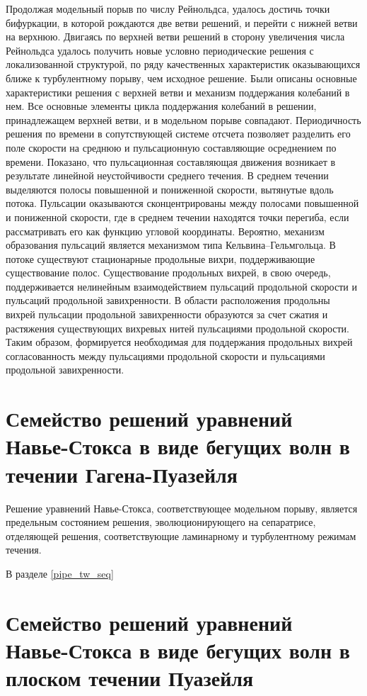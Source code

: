 Продолжая модельный порыв по числу Рейнольдса, удалось достичь точки бифуркации, в которой рождаются две ветви решений, и перейти с нижней ветви на верхнюю. Двигаясь по верхней ветви решений в сторону увеличения числа Рейнольдса удалось получить новые условно периодические решения с локализованной структурой, по ряду качественных характеристик оказывающихся ближе к турбулентному порыву, чем исходное решение. Были описаны основные характеристики решения с верхней ветви и механизм поддержания колебаний в нем. Все основные элементы цикла поддержания колебаний в решении, принадлежащем верхней ветви, и в модельном порыве совпадают. Периодичность решения по времени в сопутствующей системе отсчета позволяет разделить его поле скорости на среднюю и пульсационную составляющие осреднением по времени. Показано, что пульсационная составляющая движения возникает в результате линейной неустойчивости среднего течения. В среднем течении выделяются полосы повышенной и пониженной скорости, вытянутые вдоль потока. Пульсации оказываются сконцентрированы между полосами повышенной и пониженной скорости, где в среднем течении находятся точки перегиба, если рассматривать его как функцию угловой координаты. Вероятно, механизм образования пульсаций является механизмом типа Кельвина--Гельмгольца. В потоке существуют стационарные продольные вихри, поддерживающие существование полос. Существование продольных вихрей, в свою очередь, поддерживается нелинейным взаимодействием пульсаций продольной скорости и пульсаций продольной завихренности. В области расположения продольны вихрей пульсации продольной завихренности образуются за счет сжатия и растяжения существующих вихревых нитей пульсациями продольной скорости. Таким образом, формируется необходимая для поддержания продольных вихрей согласованность между пульсациями продольной скорости и пульсациями продольной завихренности. 

\section{Семейство решений уравнений Навье-Стокса в виде бегущих волн в течении Гагена-Пуазейля}

Решение уравнений Навье-Стокса, соответствующее модельном порыву, является предельным состоянием решения, эволюционирующего на сепаратрисе, отделяющей решения, соответствующие ламинарному и турбулентному режимам течения. 

В разделе \ref{pipe_tw_seq} 

\section{Семейство решений уравнений Навье-Стокса в виде бегущих волн в плоском течении Пуазейля}

